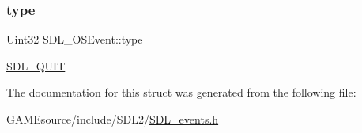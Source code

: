 \subsubsection{\texorpdfstring{type}{type}}
{\footnotesize\ttfamily Uint32 S\+D\+L\+\_\+\+O\+S\+Event\+::type}

\mbox{\hyperlink{_s_d_l__events_8h_a3b589e89be6b35c02e0dd34a55f3fccaa31acc5fdafc86ebe2c1f5c3cae48d603}{S\+D\+L\+\_\+\+Q\+U\+IT}} 

The documentation for this struct was generated from the following file\+:\begin{DoxyCompactItemize}
\item 
G\+A\+M\+Esource/include/\+S\+D\+L2/\mbox{\hyperlink{_s_d_l__events_8h}{S\+D\+L\+\_\+events.\+h}}\end{DoxyCompactItemize}
